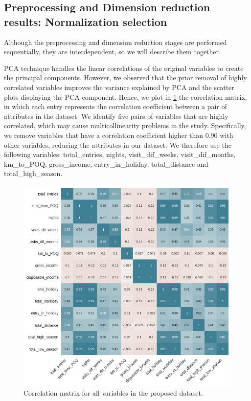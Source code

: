 \subsection*{Preprocessing and Dimension reduction results: Normalization selection}


Although the preprocessing and dimension reduction stages are performed sequentially, they are interdependent, so we will describe them together. 

PCA technique handles the linear correlations of the original variables to create the principal components. However, we observed that the prior removal of highly correlated variables improves the variance explained by PCA and the scatter plots displaying the PCA component. Hence, we plot in \cref{fig:matrix} the correlation matrix, in which each entry represents the correlation coefficient between a pair of attributes in the dataset. We identify five pairs of variables that are highly correlated, which may cause multicollinearity problems in the study. Specifically, we remove variables that have a correlation coefficient higher than 0.90 with other variables, reducing the attributes in our dataset. We therefore use the following variables: total\_entries, nights, visit\_dif\_weeks, visit\_dif\_months, km\_to\_POQ, gross\_income, entry\_in\_holiday, total\_distance and total\_high\_season.


\begin{figure}
\begin{center}
	\includegraphics[width = \linewidth]{Images/matriz_corr_v2.png}
\end{center}
	\caption{\label{fig:matrix} Correlation matrix for all variables in the proposed dataset.}
\end{figure}

